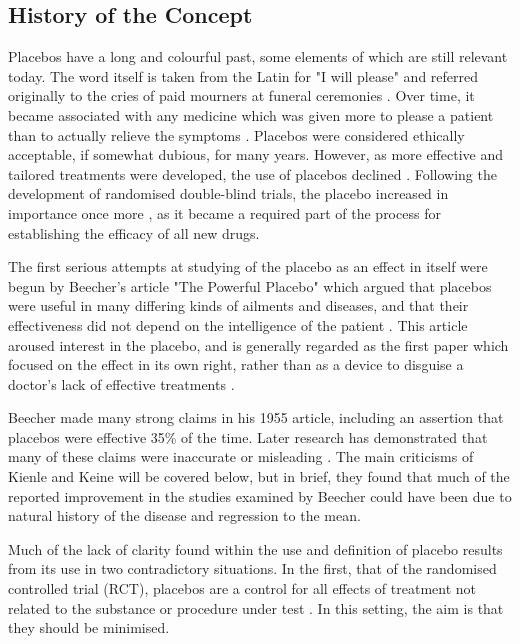 \subsection{History of the Concept} 
\label{sec:history-concept}

Placebos have a long and colourful past, some elements of which are still relevant today. The word itself is taken from the Latin for "I will please" and referred originally to the cries of paid mourners at funeral ceremonies \cite{Macedo2003}. Over time, it became associated with any medicine which was given more to please a patient than to actually relieve the symptoms \cite{Kaptchuk1998}. Placebos were considered ethically acceptable, if somewhat dubious, for many years. However, as more effective and tailored treatments were developed, the use of placebos declined \cite{Macedo2003}. Following the development of randomised double-blind trials, the  placebo increased in importance once more \cite{Kaptchuk1998}, as it became a required part of the process for establishing the efficacy of all new drugs.  

The first serious attempts at studying of the placebo as an effect in itself  were begun by Beecher's article "The Powerful Placebo" which argued that placebos were useful in many differing kinds of ailments and diseases, and that their effectiveness did not depend on the intelligence of the patient .  This article aroused interest in the placebo, and is generally regarded as the first paper which focused on the effect in its own right, rather than as a device to disguise a doctor's lack of effective treatments \cite{beecher1955powerful,Kaptchuk1998}. 

Beecher made many strong claims in his 1955 article, including an assertion that placebos were effective 35\% of the time. Later research has demonstrated that many of these claims were  inaccurate or misleading \cite{Kienle1998}. The main criticisms of Kienle and Keine will be covered below, but in brief, they found that much of the reported improvement in the studies examined by Beecher could have been due to natural history of the disease and regression to the mean.  

Much of the lack of clarity found within the use and definition of placebo \cite{Macedo2003,Kaptchuk1998} results from its use in two contradictory situations. In the first, that of the randomised controlled trial (RCT), placebos are a control for all effects of treatment not related to the substance or procedure under test \cite{Vickers2000}. In this setting, the aim is that they should be minimised. 

